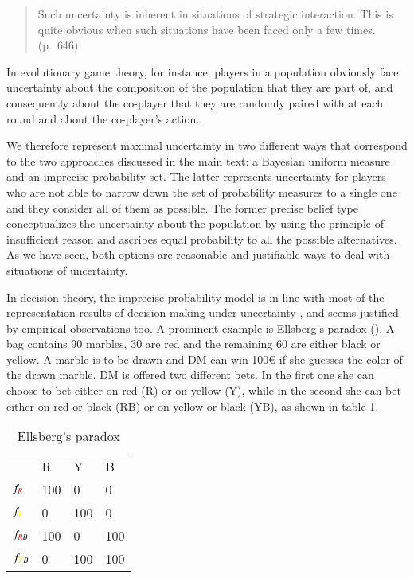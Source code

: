 \documentclass[fleqn,reqno,12pt]{article}
\theoremstyle{Satz}
\theoremstyle{Bsp}
\begin{document}
\begin{quote}
  Such uncertainty is inherent in situations of strategic interaction. This is quite obvious
  when such situations have been faced only a few times. (p.~646)
\end{quote}

\noindent In evolutionary game theory, for instance, players in a population obviously face
uncertainty about the composition of the population that they are part of, and consequently
about the co-player that they are randomly paired with at each round and about the co-player's
action. 

We therefore represent maximal uncertainty in two different ways that correspond to the two
approaches discussed in the main text: a Bayesian uniform measure and an imprecise probability
set. The latter represents uncertainty for players who are not able to narrow down the set of
probability measures to a single one and they consider all of them as possible. The former
precise belief type conceptualizes the uncertainty about the population by using the principle
of insufficient reason and ascribes equal probability to all the possible alternatives. As we
have seen, both options are reasonable and justifiable ways to deal with situations of
uncertainty.

In decision theory, the imprecise probability model is in line with most of the representation
results of decision making under uncertainty \citep[e.g.,][]{gilsch89,KlibMarMuk05,GhirMar02},
and seems justified by empirical observations too. A prominent example is Ellsberg's paradox
(\citet{ells61}). A bag contains 90 marbles, 30 are red and the remaining 60 are either black
or yellow. A marble is to be drawn and DM can win 100€ if she guesses the color of the drawn
marble. DM is offered two different bets. In the first one she can choose to bet either on
red (R) or on yellow (Y), while in the second she can bet either on red or black (RB) or on
yellow or black (YB), as shown in table \ref{Ellsberg}.



\begin{table}[h]
\centering
\begin{tabular}{@{}llll@{}}
\cmidrule(l){2-4}
\multicolumn{1}{c}{} & {\color{red}R}   & {\color{yellow}Y}   & B   \\ \cmidrule(l){2-4} 
$f_{{\color{red}R}}$              & 100 & 0   & 0   \\
$f_{{\color{yellow}Y}}$              & 0   & 100 & 0   \\
$f_{{\color{red}R}B}$            & 100 & 0   & 100 \\
$f_{{\color{yellow}Y}B}$             & 0   & 100 & 100 \\ \bottomrule
\end{tabular}
\caption{Ellsberg's paradox}
\label{Ellsberg}
\end{table}
\end{document}
